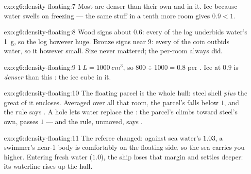 \begin{solution}{exo:g6:density-floating:7}
Most  are denser than their own  and  in it. Ice
 because water swells on freezing --- the same stuff in a
tenth more room gives  $0.9 < 1$.
\end{solution}

\begin{solution}{exo:g6:density-floating:8}
Wood signs about $0.6$: every  of the log
underbids water's \qty{1}{g}, so the log  however huge.
Bronze signs near $9$: every  of the coin
outbids water, so it  however small. Size never mattered;
the per-room  always did.
\end{solution}

\begin{solution}{exo:g6:density-floating:9}
$\qty{1}{L} = \qty{1000}{cm^3}$, so $800 \div 1000 = 0.8$ 
per . Ice at $0.9$ is \emph{denser} than this
: the ice cube  in it.
\end{solution}

\begin{solution}{exo:g6:density-floating:10}
The floating parcel is the whole hull: steel shell \emph{plus}
the great  of  it encloses. Averaged over all that room,
the parcel's  falls below $1$, and the rule says . A
hole lets water replace the : the parcel's  climbs
toward steel's own, passes $1$ --- and the rule, unmoved,
says .
\end{solution}

\begin{solution}{exo:g6:density-floating:11}
The referee changed: against sea water's $1.03$, a swimmer's
near-$1$ body is comfortably on the floating side, so the sea
carries you higher. Entering fresh water ($1.0$), the ship loses
that margin and settles deeper: its waterline rises up the hull.
\end{solution}

